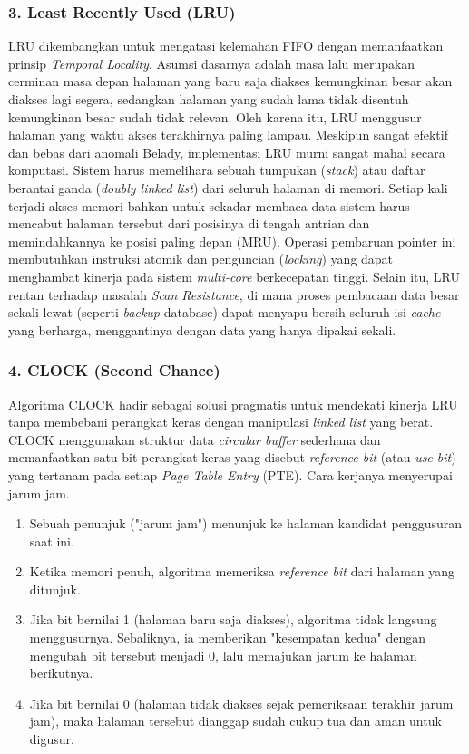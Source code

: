 \subsubsection{3. Least Recently Used (LRU)}
LRU dikembangkan untuk mengatasi kelemahan FIFO dengan memanfaatkan prinsip
\textit{Temporal Locality}. Asumsi dasarnya adalah masa lalu
merupakan cerminan masa depan
halaman yang baru saja diakses kemungkinan besar akan diakses lagi segera,
sedangkan halaman yang sudah lama tidak disentuh kemungkinan besar
sudah tidak relevan.
Oleh karena itu, LRU menggusur halaman yang waktu akses terakhirnya
paling lampau.
Meskipun sangat efektif dan bebas dari anomali Belady, implementasi
LRU murni sangat mahal
secara komputasi.
Sistem harus memelihara sebuah tumpukan (\textit{stack}) atau daftar
berantai ganda
(\textit{doubly linked list}) dari seluruh halaman di memori.
Setiap kali terjadi akses memori bahkan untuk sekadar membaca
data sistem harus mencabut
halaman tersebut dari posisinya di tengah antrian dan memindahkannya
ke posisi paling depan (MRU).
Operasi pembaruan pointer ini membutuhkan instruksi atomik dan
penguncian (\textit{locking})
yang dapat menghambat kinerja pada sistem \textit{multi-core}
berkecepatan tinggi.
Selain itu, LRU rentan terhadap masalah \textit{Scan Resistance}, di
mana proses pembacaan data
besar sekali lewat (seperti \textit{backup} database) dapat menyapu
bersih seluruh isi \textit{cache}
yang berharga, menggantinya dengan data yang hanya dipakai sekali.

\subsubsection{4. CLOCK (Second Chance)}
Algoritma CLOCK hadir sebagai solusi pragmatis untuk mendekati kinerja LRU tanpa
membebani perangkat keras dengan manipulasi \textit{linked list} yang berat.
CLOCK menggunakan struktur data \textit{circular buffer} sederhana
dan memanfaatkan
satu bit perangkat keras yang disebut \textit{reference bit} (atau
\textit{use bit})
yang tertanam pada setiap \textit{Page Table Entry} (PTE). Cara
kerjanya menyerupai jarum jam.

\begin{enumerate}
  \item Sebuah penunjuk ("jarum jam") menunjuk ke halaman kandidat
    penggusuran saat ini.
  \item Ketika memori penuh, algoritma memeriksa \textit{reference
    bit} dari halaman yang ditunjuk.
  \item Jika bit bernilai 1 (halaman baru saja diakses), algoritma
    tidak langsung menggusurnya.
    Sebaliknya, ia memberikan "kesempatan kedua" dengan mengubah bit
    tersebut menjadi 0,
    lalu memajukan jarum ke halaman berikutnya.
  \item Jika bit bernilai 0 (halaman tidak diakses sejak pemeriksaan
    terakhir jarum jam),
    maka halaman tersebut dianggap sudah cukup tua dan aman untuk digusur.
\end{enumerate}

